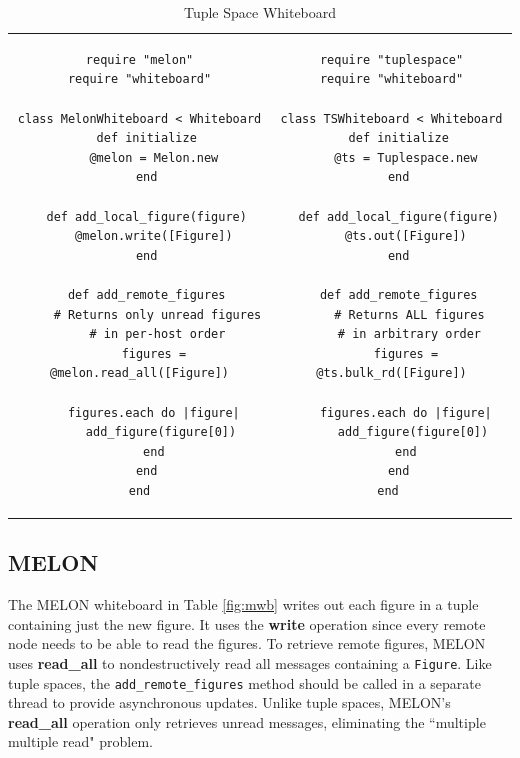 \documentclass{llncs}
\begin{document}
\begin{table}
\centering
\begin{tabular}{c c}
\begin{minipage}{2.75in}
\begin{verbatim}
require "melon"
require "whiteboard"

class MelonWhiteboard < Whiteboard
  def initialize
    @melon = Melon.new
  end
  
  def add_local_figure(figure)
    @melon.write([Figure])
  end

  def add_remote_figures
  	 # Returns only unread figures
  	 # in per-host order
    figures = @melon.read_all([Figure])

    figures.each do |figure|
      add_figure(figure[0])
    end
  end
end
\end{verbatim}
\caption{MELON Whiteboard}\label{fig:mwb}
\end{minipage}
&
\begin{minipage}{2.5in}
\begin{verbatim}
require "tuplespace"
require "whiteboard"

class TSWhiteboard < Whiteboard
  def initialize
    @ts = Tuplespace.new
  end

  def add_local_figure(figure)
    @ts.out([Figure])
  end

  def add_remote_figures
  	 # Returns ALL figures
  	 # in arbitrary order
    figures = @ts.bulk_rd([Figure])

    figures.each do |figure|
      add_figure(figure[0])
    end
  end
end	
\end{verbatim}
\caption{Tuple Space Whiteboard}\label{fig:tswb}
\end{minipage}
\end{tabular}
\end{table}

\subsection{MELON}

The MELON whiteboard in Table \ref{fig:mwb} writes out each figure in a tuple containing just the new figure. It uses the \textbf{write} operation since every remote node needs to be able to read the figures. To retrieve remote figures, MELON uses \textbf{read\_all} to nondestructively read all messages containing a \texttt{Figure}. Like tuple spaces, the \texttt{add\_remote\_figures} method should be called in a separate thread to provide asynchronous updates. Unlike tuple spaces, MELON's \textbf{read\_all} operation only retrieves unread messages, eliminating the ``multiple multiple read" problem.
\end{document}
